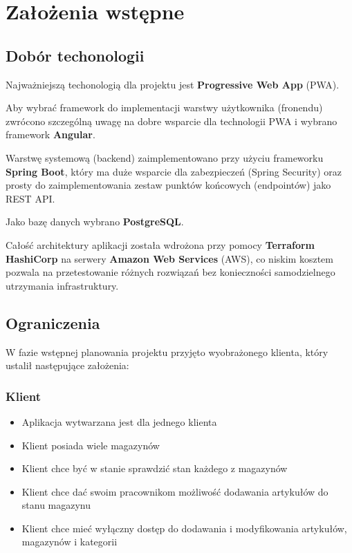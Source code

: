 \documentclass[../main.tex]{subfiles}
\begin{document}
\section{Założenia wstępne}
    \subsection{Dobór techonologii}
        Najważniejszą techonologią dla projektu jest \textbf{Progressive Web App} (PWA). 
        
        Aby wybrać framework do implementacji warstwy użytkownika (fronendu) zwrócono szczególną uwagę na dobre wsparcie dla technologii PWA i wybrano framework \textbf{Angular}.

        Warstwę systemową (backend) zaimplementowano przy użyciu frameworku \textbf{Spring Boot}, który ma duże wsparcie dla zabezpieczeń (Spring Security) oraz prosty do zaimplementowania zestaw punktów końcowych (endpointów) jako REST API.

        Jako bazę danych wybrano \textbf{PostgreSQL}.

        Całość architektury aplikacji została wdrożona przy pomocy \textbf{Terraform HashiCorp} na serwery \textbf{Amazon Web Services} (AWS), co niskim kosztem pozwala na przetestowanie różnych rozwiązań bez konieczności samodzielnego utrzymania infrastruktury.
    \subsection{Ograniczenia}
        W fazie wstępnej planowania projektu przyjęto wyobrażonego klienta, który ustalił następujące założenia:
        \subsubsection*{Klient}
            \begin{itemize}
                \item Aplikacja wytwarzana jest dla jednego klienta
                \item Klient posiada wiele magazynów
                \item Klient chce być w stanie sprawdzić stan każdego z magazynów
                \item Klient chce dać swoim pracownikom możliwość dodawania artykułów do stanu magazynu
                \item Klient chce mieć wyłączny dostęp do dodawania i modyfikowania artykułów, magazynów i kategorii
            \end{itemize} 
\end{document}
